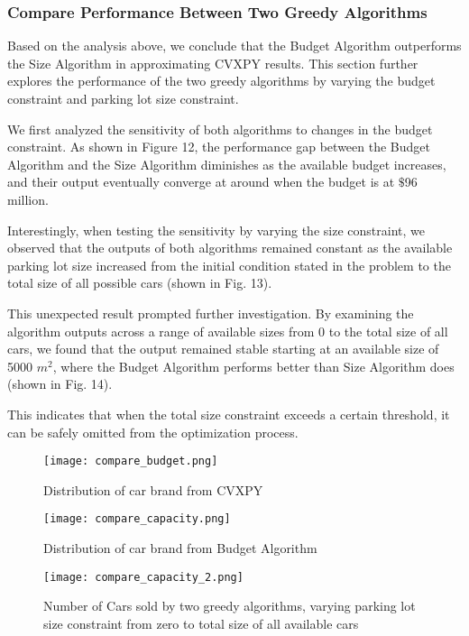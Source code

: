 \documentclass{article}
\begin{document}
\subsubsection{Compare Performance Between Two Greedy Algorithms}
Based on the analysis above, we conclude that the Budget Algorithm outperforms the Size Algorithm in approximating CVXPY results. This section further explores the performance of the two greedy algorithms by varying the budget constraint and parking lot size constraint. \par
We first analyzed the sensitivity of both algorithms to changes in the budget constraint. As shown in Figure 12, the performance gap between the Budget Algorithm and the Size Algorithm diminishes as the available budget increases, and their output eventually converge at around when the budget is at $\$$96 million.  \par
Interestingly, when testing the sensitivity by varying the size constraint, we observed that the outputs of both algorithms remained constant as the available parking lot size increased from the initial condition stated in the problem to the total size of all possible cars (shown in Fig. 13).  \par
This unexpected result prompted further investigation. By examining the algorithm outputs across a range of available sizes from 0 to the total size of all cars, we found that the output remained stable starting at an available size of 5000 \(m^2\), where the Budget Algorithm performs better than Size Algorithm does (shown in Fig. 14).  \par
This indicates that when the total size constraint exceeds a certain threshold, it can be safely omitted from the optimization process.\par
\begin{figure}[h]
    \centering
    \begin{minipage}{0.45\textwidth}
        \centering
        \texttt{[image: compare\_budget.png]}
        \caption{Distribution of car brand from CVXPY}
        \label{fig:compare_budget}
    \end{minipage}\hfill
    \begin{minipage}{0.45\textwidth}
        \centering
        \texttt{[image: compare\_capacity.png]}
        \caption{Distribution of car brand from Budget Algorithm}
        \label{fig:compare_capacity}
    \end{minipage}\hfill
    \begin{minipage}{0.45\textwidth}
        \centering
        \texttt{[image: compare\_capacity\_2.png]}
        \caption{Number of Cars sold by two greedy algorithms, varying parking lot size constraint from zero to total size of all available cars}
        \label{fig:compare_capacity_2}
    \end{minipage}
\end{figure}
\end{document}
